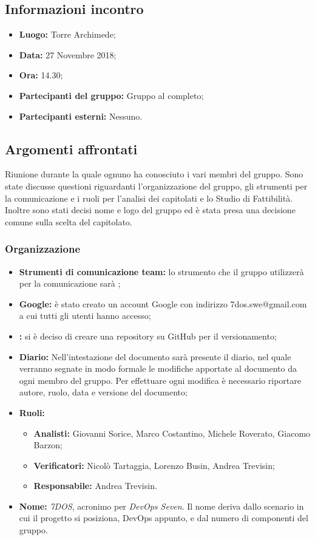 \subsection{Informazioni incontro}
\begin{itemize}
	\item { \textbf{Luogo:} Torre Archimede};
	\item { \textbf{Data:} 27 Novembre 2018};
	\item { \textbf{Ora:} 14.30};
	\item { \textbf{Partecipanti del gruppo:} Gruppo al completo};
	\item { \textbf{Partecipanti esterni:} Nessuno}.
\end{itemize}


\subsection{Argomenti affrontati}
Riunione durante la quale ognuno ha conosciuto i vari membri del gruppo. Sono state discusse questioni riguardanti l'organizzazione del gruppo, gli strumenti per la comunicazione e i ruoli per l'analisi dei capitolati e lo Studio di Fattibilità. Inoltre sono stati decisi nome e logo del gruppo ed è stata presa una decisione comune sulla scelta del capitolato.

\subsubsection{Organizzazione}
\begin{itemize}
	\item { \textbf{Strumenti di comunicazione team:} lo strumento che il gruppo utilizzerà per la comunicazione sarà \textit{};}
	\item{ \textbf{Google:} è stato creato un account Google con indirizzo 7dos.swe@gmail.com a cui tutti gli utenti hanno accesso;}
	\item { \textbf{:} si è deciso di creare una repository su GitHub per il versionamento;}
	\item { \textbf{Diario:} Nell'intestazione del documento sarà presente il diario, nel quale verranno segnate in modo formale le modifiche apportate al documento da ogni membro del gruppo.
		Per effettuare ogni modifica è necessario riportare autore, ruolo, data e versione del documento;}
	\item { \textbf{Ruoli:}  }
	\begin{itemize}
		\item { \textbf{Analisti:} Giovanni Sorice, Marco Costantino, Michele Roverato, Giacomo Barzon;}
		\item { \textbf{Verificatori:} Nicolò Tartaggia, Lorenzo Busin, Andrea Trevisin;}
		\item { \textbf{Responsabile:} Andrea Trevisin.}
	\end{itemize}
	\item { \textbf{Nome:} \emph{7DOS}, acronimo per \emph{DevOps Seven}. Il nome deriva dallo scenario in cui il progetto si posiziona, DevOps appunto, e dal numero di componenti del gruppo.}
\end{itemize}

